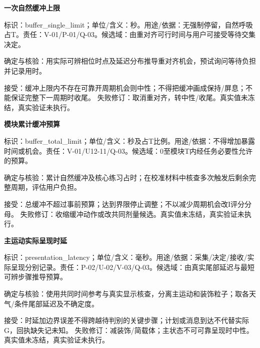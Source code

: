 \documentclass[11pt,a4paper]{article}
\newcommand{\reviewsubsection}[1]{\par\Needspace{4\baselineskip}\begin{center}{\titlelatin\titlecjk\bfseries\fontsize{12}{18}\selectfont #1}\end{center}}
\begin{document}
\begin{minipage}{\linewidth}
\reviewsubsection{8.11 一次自然缓冲上限}
标识：buffer\_\allowbreak{}single\_\allowbreak{}limit；单位/\allowbreak{}含义：秒。用途/\allowbreak{}依据：无强制停留，自然呼吸占T。责任：V-\allowbreak{}01/\allowbreak{}P-\allowbreak{}01/\allowbreak{}Q-\allowbreak{}03。候选域：由重对齐可行时间与用户可接受等待交集决定。

确定与核验：用实际可辨相位时点及延迟分布推导重对齐机会，预试询问等待负担并记录用时。

接受：缓冲上限内不存在可靠开周期机会则中性；不得把缓冲画成保持/\allowbreak{}屏息；不能保证完整下一周期时收尾。 失败修订：取消重对齐，转中性/\allowbreak{}收尾。真实值未冻结，真实验证未执行。
\end{minipage}\par

\begin{minipage}{\linewidth}
\reviewsubsection{8.12 模块累计缓冲预算}
标识：buffer\_\allowbreak{}total\_\allowbreak{}limit；单位/\allowbreak{}含义：秒及占T比例。用途/\allowbreak{}依据：不得增加暴露时间或机会。责任：V-\allowbreak{}01/\allowbreak{}U12-\allowbreak{}11/\allowbreak{}Q-\allowbreak{}03。候选域：0至模块T内经任务必要性允许的预算。

确定与核验：累计自然缓冲及核心练习占时；在校准材料中核查多次触发后剩余完整周期，评估用户负担。

接受：总缓冲不超过事前预算；达到界限停止调整；不以减少周期机会改I评分分母。 失败修订：收缩缓冲动作或改共同剂量候选。真实值未冻结，真实验证未执行。
\end{minipage}\par

\begin{minipage}{\linewidth}
\reviewsubsection{8.13 主运动实际呈现时延}
标识：presentation\_\allowbreak{}latency；单位/\allowbreak{}含义：毫秒。用途/\allowbreak{}依据：采集/\allowbreak{}决定/\allowbreak{}接收/\allowbreak{}实际呈现分别记录。责任：P-\allowbreak{}02/\allowbreak{}U-\allowbreak{}02/\allowbreak{}V-\allowbreak{}03/\allowbreak{}Q-\allowbreak{}03。候选域：由真实尾部延迟与最短可辨步骤推导预算。

确定与核验：使用共同时间参考与真实显示核查，分离主运动和装饰粒子；取各天气/\allowbreak{}条件尾部延迟及不确定度。

接受：时延加边界误差不得跨越待判别的关键步骤；计划或消息到达不代替实际G，回执缺失记未知。 失败修订：减装饰/\allowbreak{}简载体；主状态不可可靠呈现时中性。真实值未冻结，真实验证未执行。
\end{minipage}\par
\end{document}
